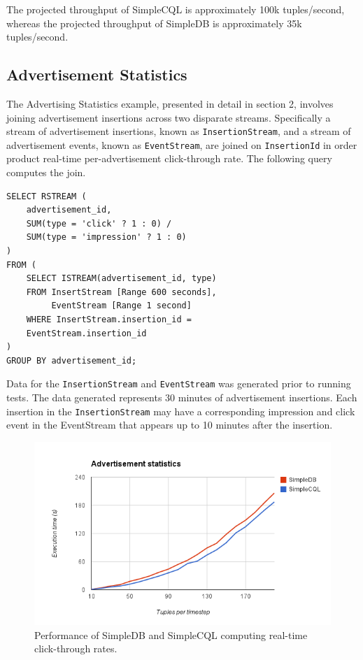 \documentclass[a4paper, 10pt, conference]{IEEEconf}
\begin{document}
The projected throughput of SimpleCQL is approximately 100k tuples/second, whereas the projected throughput of SimpleDB is approximately 35k tuples/second.

\subsection{Advertisement Statistics}
The Advertising Statistics example, presented in detail in section 2, involves joining advertisement insertions across two disparate streams.  Specifically a stream of advertisement insertions, known as \texttt{InsertionStream}, and a stream of advertisement events, known as \texttt{EventStream}, are joined on \texttt{InsertionId} in order product real-time per-advertisement click-through rate.  The following query computes the join.

\begin{verbatim}
SELECT RSTREAM (
    advertisement_id,
    SUM(type = 'click' ? 1 : 0) / 
    SUM(type = 'impression' ? 1 : 0)
)
FROM (
    SELECT ISTREAM(advertisement_id, type)
    FROM InsertStream [Range 600 seconds], 
         EventStream [Range 1 second] 
    WHERE InsertStream.insertion_id = 
    EventStream.insertion_id
) 
GROUP BY advertisement_id;
\end{verbatim}

Data for the \texttt{InsertionStream} and \texttt{EventStream} was generated prior to running tests.  The data generated represents 30 minutes of advertisement insertions.  Each insertion in the \texttt{InsertionStream} may have a corresponding impression and click event in the EventStream that appears up to 10 minutes after the insertion.

\begin{figure}[tpH!]
    \centering
    \centerline{\includegraphics[totalheight=5cm]{ads.png}}
    \caption{Performance of SimpleDB and SimpleCQL computing real-time click-through rates.}
    \label{fig:ads}
\end{figure}
\end{document}
